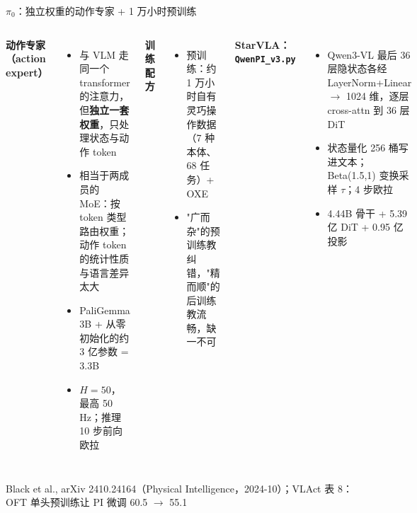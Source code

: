 \documentclass[aspectratio=169,10pt]{beamer}
\newcommand{\con}[1]{\textcolor{negative}{#1}}
\begin{document}
\begin{frame}{$\pi_0$：独立权重的动作专家 + 1 万小时预训练}
  \begin{columns}[T]
    \textbf{动作专家（action expert）}
    \begin{itemize}
      \item 与 VLM 走同一个 transformer 的注意力，但\textbf{独立一套权重}，只处理状态与动作 token
      \item 相当于两成员的 MoE：按 token 类型路由权重；动作 token 的统计性质与语言差异太大
      \item PaliGemma 3B + 从零初始化的约 3 亿参数 = 3.3B
      \item $H=50$，最高 50 Hz；推理 10 步前向欧拉
    \end{itemize}
    \textbf{训练配方}
    \begin{itemize}
      \item 预训练：约 1 万小时自有灵巧操作数据（7 种本体、68 任务）+ OXE
      \item "广而杂"的预训练教纠错，"精而顺"的后训练教流畅，缺一不可
    \end{itemize}
    \textbf{StarVLA：\texttt{QwenPI\_v3.py}}
    \begin{itemize}
      \item Qwen3-VL 最后 36 层隐状态各经 LayerNorm+Linear $\to$ 1024 维，逐层 cross-attn 到 36 层 DiT
      \item 状态量化 256 桶写进文本；Beta(1.5,1) 变换采样 $\tau$；4 步欧拉
      \item 4.44B 骨干 + 5.39 亿 DiT + 0.95 亿投影
    \end{itemize}
  \end{columns}
  \vspace{2pt}
  \small Black et al., arXiv 2410.24164（Physical Intelligence，2024-10）；VLAct 表 8：OFT 单头预训练让 PI 微调 60.5 $\to$ \con{55.1}
\end{frame}

\end{document}
